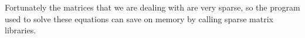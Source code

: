 Fortunately the matrices that we are dealing with are very sparse, so the program used to solve these equations can save on memory by calling sparse matrix libraries.


%
%
%
